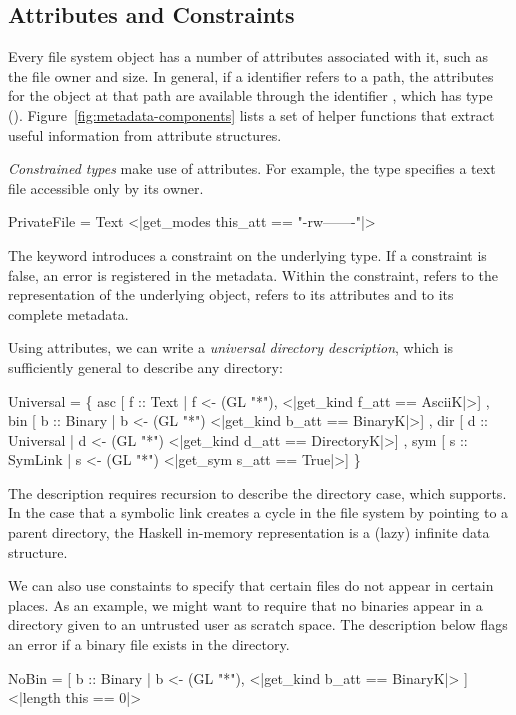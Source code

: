 \subsection{Attributes and Constraints}
\label{sec:constraints}

Every file system object has a number of attributes associated with
it, such as the file owner and size.  In general,
if a \forest{} identifier  refers to a path, the attributes for the object at that
path are available through the identifier , which has
type  ().
Figure~\ref{fig:metadata-components} lists a set of helper functions that
extract useful information from attribute structures.

\textit{Constrained types} make use of attributes. For example, the
type  specifies a text file accessible only by its owner.
\begin{code}
 PrivateFile = 
 Text  <|get_modes this_att == "-rw-------"|>
\end{code}
The keyword  introduces a constraint on the underlying type.
If a constraint is false, an error 
is registered in the metadata.  Within the constraint,  refers to the representation 
of the underlying object,  refers to its attributes and  
to its complete metadata.

Using attributes, we can write a \textit{universal
  directory description}, which is sufficiently general to describe
any directory:
\begin{code}
 Universal = 
  \{ asc  [ f :: Text
           | f <-  (GL "*"), 
            <|get_kind f_att == AsciiK|>]
  , bin  [ b :: Binary
           | b <-  (GL "*") 
            <|get_kind b_att == BinaryK|>]
  , dir  [ d :: Universal  
           | d <-  (GL "*") 
            <|get_kind d_att == DirectoryK|>]
  , sym  [ s :: SymLink      
           | s <-  (GL "*") 
            <|get_sym s_att == True|>]
  \}
\end{code}
The description requires recursion to describe the directory case,
which \forest{} supports.
In the case that a symbolic link creates a cycle in the file system by
pointing to a parent directory, the Haskell in-memory representation
is a (lazy) infinite data structure.  

We can also use constaints to specify that certain files do not appear
in certain places.  As an example, we might want to require that no
binaries appear in a directory given to an untrusted user as scratch
space. The description below flags an error if a binary file exists
in the directory. 
\begin{code}
 NoBin =
  [ b :: Binary
  | b <-  (GL "*"), 
  <|get_kind b_att == BinaryK|> ]
   <|length this == 0|>
\end{code}

